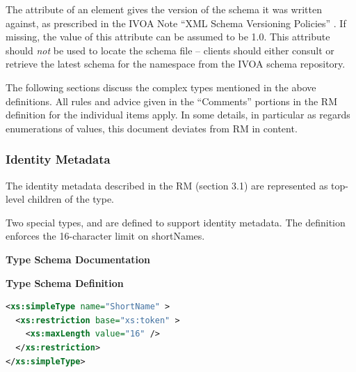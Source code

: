 \documentclass[11pt,a4paper]{ivoa}
\begin{document}
The  attribute of an  element gives
the version of the schema it was written against, as prescribed in the
IVOA Note ``XML Schema Versioning Policies''
\citep{note:schemaevolution}.  If missing, the value of this attribute
can be assumed to be 1.0.  This attribute should \emph{not} be used to
locate the schema file -- clients should either consult
 or retrieve the latest schema for the 
namespace from the IVOA schema repository.

The following sections discuss the complex types mentioned in the above
definitions.
All rules and advice given in the ``Comments'' portions in
the RM definition for the individual items 
apply. In some details, in particular as regards enumerations of values,
this document deviates from RM in content.

\subsubsection{Identity Metadata}

The identity metadata described in the RM (section
3.1) are represented as top-level children of the
 type.

Two special types,  and
 are defined to support identity
metadata.  The  definition enforces the
16-character limit on shortNames.  

\begin{generated}
\begingroup
      	\renewcommand*\descriptionlabel[1]{%
      	\hbox to 5.5em{\emph{#1}\hfil}}\vspace{2ex}\noindent\textbf{ Type Schema Documentation}




\vspace{1ex}\noindent\textbf{ Type Schema Definition}

\begin{lstlisting}[language=XML,basicstyle=\footnotesize]
<xs:simpleType name="ShortName" >
  <xs:restriction base="xs:token" >
    <xs:maxLength value="16" />
  </xs:restriction>
</xs:simpleType>
\end{lstlisting}\endgroup
\end{generated}
\end{document}
